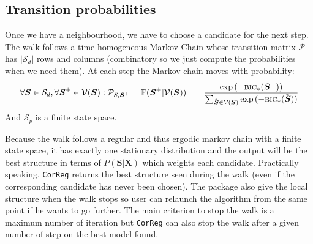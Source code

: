\documentclass[12pt,a4paper]{report}
\begin{document}
	
	
	\subsection{Transition probabilities}
		Once we have a neighbourhood, we have to choose a candidate for the next step.
The walk follows a time-homogeneous Markov Chain whose transition matrix $\mathcal{P}$ has $|\mathcal{S}_d|$ rows and columns (combinatory so we just compute the probabilities when we need them).
	At each step the Markov chain moves with probability:
	\begin{eqnarray}
			\forall \boldsymbol{S} \in \mathcal{S}_d, \forall \boldsymbol{S}^+\in \mathcal{V}(\boldsymbol{S}) : \mathcal{P}_{S,\boldsymbol{S}^+}=\mathbb{P}(\boldsymbol{S}^+|\mathcal{V}(\boldsymbol{S}))&=&\frac{\exp{(-\mbox{{\sc bic}}_*(\boldsymbol{S}^+))}}{\sum_{\tilde{\boldsymbol{S}}\in \mathcal{V}(\boldsymbol{S})}\exp{(-\mbox{{\sc bic}}_*(\tilde{\boldsymbol{S}}))}} 
	\end{eqnarray}
	And $\mathcal{S}_p$ is a finite state space.%
	 
Because the walk follows a regular and thus ergodic markov chain with a finite state space, it has exactly one stationary distribution \cite{grinstead1997introduction} %
%	
%	
%		
and the output will be the best structure in terms of $P(\boldsymbol{S}|\boldsymbol{X})$ which weights each candidate. Practically speaking, {\tt CorReg} returns the best structure seen during the walk (even if the corresponding candidate has never been chosen). The package also give the local structure when the walk stops so user can relaunch the algorithm from the same point if he wants to go further.
The main criterion to stop the walk is a maximum number of iteration but {\tt CorReg} can also stop the walk after a given number of step on the best model found.	
	
\end{document}
